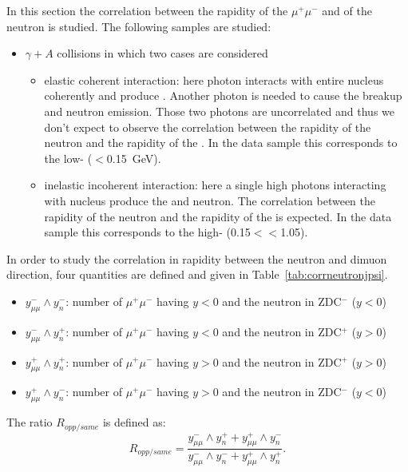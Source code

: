 \DIFaddend \iffalse
    In this section the correlation between the rapidity of the $\mu^{+}\mu^{-}$ 
      and of the neutron is studied. The following samples are studied: 
    \begin{itemize}
      \item $\gamma + A$ collisions in which two cases are considered
      \begin{itemize}
        \item elastic coherent interaction: here photon interacts with entire
          nucleus coherently and produce \JPsi. 
          Another photon is needed to cause the breakup and neutron emission. 
          Those two photons are uncorrelated and thus we don't expect to 
            observe the correlation between the rapidity of the neutron and the
            rapidity of the \JPsi.
          In the data sample this corresponds to the low-\pt \JPsi 
            (\pt$<$0.15~GeV). 
        \item inelastic incoherent interaction: here a single high \pt photons
          interacting with nucleus produce the \JPsi and neutron. 
          The correlation between the rapidity of the neutron and the rapidity
            of the \JPsi is expected.
          In the data sample this corresponds to the high-\pt \JPsi 
            (0.15$<$\pt$<$1.05). 
      \end{itemize}
    \end{itemize}

    In order to study the correlation in rapidity between the neutron and
      dimuon direction, four quantities are defined and given in 
      Table~\ref{tab:corrneutronjpsi}.  
    \begin{itemize}
      \item $y^{-}_{\mu\mu} \wedge y_{n}^{-}$: number of $\mu^{+}\mu^{-}$ having
         $y<0$ and the neutron in ZDC$^{-}$ ($y<0$)
      \item $y^{-}_{\mu\mu} \wedge y_{n}^{+}$: number of $\mu^{+}\mu^{-}$ having
         $y<0$ and the neutron in ZDC$^{+}$ ($y>0$)
      \item $y^{+}_{\mu\mu} \wedge y_{n}^{+}$: number of $\mu^{+}\mu^{-}$ having
         $y>0$ and the neutron in ZDC$^{+}$ ($y>0$)
      \item $y^{+}_{\mu\mu} \wedge y_{n}^{-}$: number of $\mu^{+}\mu^{-}$ having
         $y>0$ and the neutron in ZDC$^{-}$ ($y<0$)
    \end{itemize}

    The ratio $R_{opp/same}$ is defined as: 
    \begin{equation}
      R_{opp/same} = \frac{y^{-}_{\mu\mu} \wedge y_{n}^{+} + y^{+}_{\mu\mu} 
        \wedge y_{n}^{-}}{y^{-}_{\mu\mu} \wedge y_{n}^{-} + y^{+}_{\mu\mu} 
        \wedge y_{n}^{+}}.
    \end{equation}

